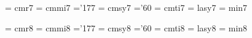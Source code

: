  \font\sevrm  = cmr7               %
 \font\sevmi  = cmmi7              %
    \skewchar\sevmi ='177          %
 \font\sevsy  = cmsy7              %
    \skewchar\sevsy ='60           %
 \font\sevit  = cmti7              %
 \font\sevly  = lasy7             %
\font\sevmin = min7		   %

 \font\egtrm  = cmr8               %
 \font\egtmi  = cmmi8              %
    \skewchar\egtmi ='177          %
 \font\egtsy  = cmsy8              %
    \skewchar\egtsy ='60           %
 \font\egtit  = cmti8              %
 \font\egtly  = lasy8             %
\font\egtmin = min8		   %


